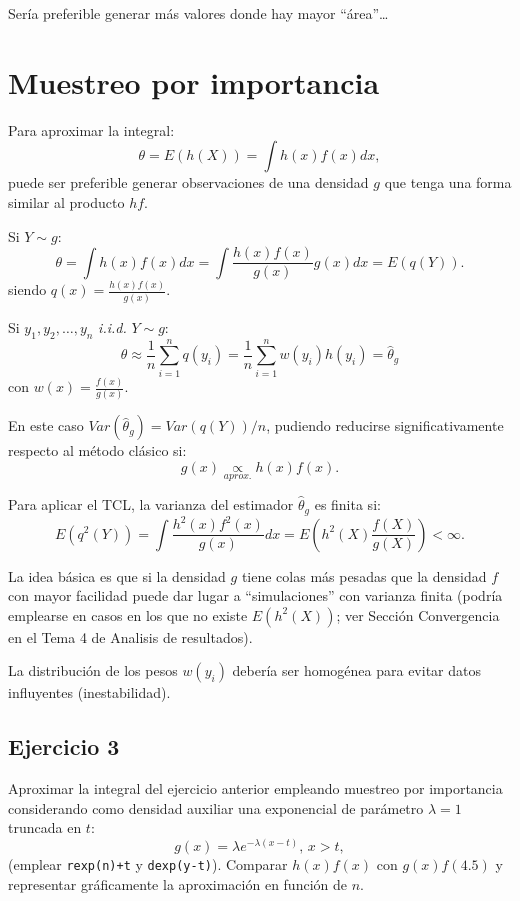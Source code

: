 \documentclass[
]{book}
\theoremstyle{break}
\theoremstyle{definition}
\theoremstyle{definition}
\theoremstyle{definition}
\theoremstyle{remark}
\begin{document}
Sería preferible generar más valores donde hay mayor ``área''\ldots{}

\hypertarget{muestreo-por-importancia}{%
\section{Muestreo por importancia}\label{muestreo-por-importancia}}

Para aproximar la integral:
\[\theta = E\left( h\left( X\right) \right) = \int h\left( x\right) f(x)dx,\]
puede ser preferible generar observaciones de una densidad \(g\)
que tenga una forma similar al producto \(hf\).

Si \(Y\sim g\):
\[\theta  = \int h\left( x\right) f(x)dx 
 = \int \frac{h\left( x\right) f(x)}{g(x)}g(x)dx
 = E\left( q\left( Y\right) \right).\]
siendo
\(q\left( x\right) = \frac{h\left( x\right) f(x)}{g(x)}\).

Si \(y_{1},y_{2},\ldots ,y_{n}\) \emph{i.i.d.} \(Y\sim g\):
\[\theta \approx \frac{1}{n}\sum\limits_{i=1}^{n}q\left( y_{i}\right) 
= \frac{1}{n}\sum\limits_{i=1}^{n}w(y_{i})h\left( y_{i}\right)  
= \hat{\theta}_{g}\]
con \(w\left( x\right) = \frac{f(x)}{g(x)}\).

En este caso
\(Var(\hat{\theta}_{g}) = Var\left( q\left( Y\right) \right) /n\),
pudiendo reducirse significativamente respecto al método
clásico si:
\[g(x)\underset{aprox.}{\propto }h\left( x\right) f(x).\]

Para aplicar el TCL, la varianza del estimador \(\hat{\theta}_{g}\)
es finita si:
\[E\left( q^{2}\left( Y\right) \right)  
= \int \frac{h^{2}\left( x\right)f^{2}(x)}{g(x)}dx 
= E\left( h^{2}\left( X\right) \frac{f(X)}{g(X)}\right)
< \infty.\]

La idea básica es que si la densidad \(g\) tiene colas más pesadas que
la densidad \(f\) con mayor facilidad puede dar lugar a
``simulaciones'' con varianza finita
(podría emplearse en casos en los que no existe
\(E \left( h^{2} \left( X \right) \right)\);
ver Sección Convergencia en el Tema 4 de Analisis de resultados).

La distribución de los pesos \(w(y_{i})\) debería ser homogénea para
evitar datos influyentes (inestabilidad).

\hypertarget{ejercicio-3}{%
\subsection{Ejercicio 3}\label{ejercicio-3}}

Aproximar la integral del ejercicio anterior empleando muestreo por importancia considerando como
densidad auxiliar una exponencial de parámetro \(\lambda=1\) truncada en \(t\):
\[g\left(  x\right)  =\lambda e^{-\lambda\left(  x-t\right)  }\text{, }x>t,\]
(emplear \texttt{rexp(n)+t} y \texttt{dexp(y-t)}).
Comparar \(h(x)f(x)\) con \(g(x)f(4.5)\) y representar gráficamente la
aproximación en función de \(n\).
\end{document}
